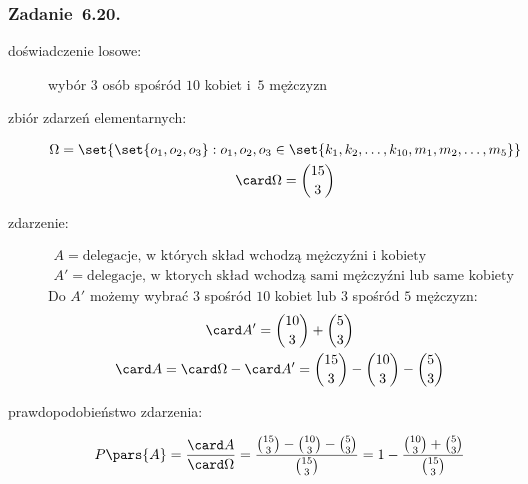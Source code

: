 \subsubsection*{Zadanie~6.20.}
\begin{description}
    \item[doświadczenie losowe:] wybór \(3\) osób spośród \(10\) kobiet i~\(5\) mężczyzn
    \item[zbiór zdarzeń elementarnych:]
        \begin{gather*}
            \Omega = \set{\set{o_1, o_2, o_3} : o_1, o_2, o_3 \in \set{k_1, k_2, \ldots, k_{10}, m_1, m_2, \ldots, m_5}}\\
            \card\Omega = \binom{15}{3}
        \end{gather*}
    \item[zdarzenie:]
        \begin{gather*}
            A = \text{delegacje, w~których skład wchodzą mężczyźni i~kobiety}\\
            A' = \text{delegacje, w~ktorych skład wchodzą sami mężczyźni lub same kobiety}
        \end{gather*}
        Do \(A'\) możemy wybrać \(3\) spośród \(10\) kobiet lub \(3\) spośród \(5\) mężczyzn:
        \begin{gather*}
            \card A' = \binom{10}{3} + \binom{5}{3}\\
            \card A = \card\Omega - \card A' = \binom{15}{3} - \binom{10}{3} - \binom{5}{3}\\
        \end{gather*}
    \item[prawdopodobieństwo zdarzenia:]
        \begin{equation*}
            P\pars{A}
                = \frac{\card A}{\card\Omega}
                = \frac{\binom{15}{3} - \binom{10}{3} - \binom{5}{3}}{\binom{15}{3}}
                = 1 - \frac{\binom{10}{3} + \binom{5}{3}}{\binom{15}{3}}
        \end{equation*}
\end{description}
